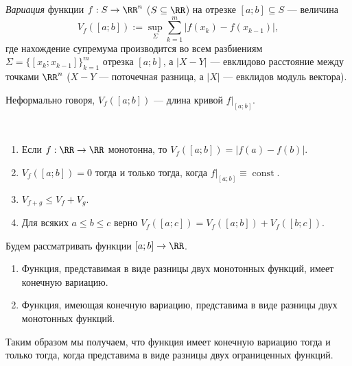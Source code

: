 \documentclass[12pt,a4paper]{article}
\DeclareMathOperator{\const}{const}
\begin{document}
    \begin{definition}
        \emph{Вариация} функции $f: S \to \RR^n$ ($S \subseteq \RR$) на отрезке $[a; b] \subseteq S$ --- величина
        \[V_f([a; b]) := \sup_\Sigma \sum_{k=1}^{m} |f(x_k) - f(x_{k-1})|,\]
        где нахождение супремума производится во всем разбиениям $\Sigma = \{[x_k; x_{k-1}]\}_{k=1}^m$ отрезка $[a; b]$, а $|X - Y|$ --- евклидово расстояние между точками $\RR^n$ ($X - Y$ --- поточечная разница, а $|X|$ --- евклидов модуль вектора).
    \end{definition}

    \begin{remark*}
        Неформально говоря, $V_f([a; b])$ --- длина кривой $f|_{[a; b]}$.
    \end{remark*}

    \begin{lemma}\ 
        \begin{enumerate}
            \item Если $f: \RR \to \RR$ монотонна, то $V_f([a; b]) = |f(a) - f(b)|$.
            \item $V_f([a; b]) = 0$ тогда и только тогда, когда $f|_{[a; b]} \equiv \const$.
            \item $V_{f+g} \leqslant V_f + V_g$.
            \item Для всяких $a \leqslant b \leqslant c$ верно $V_f([a; c]) = V_f([a; b]) + V_f([b; c])$.
        \end{enumerate}
    \end{lemma}

    \begin{lemma}
        Будем рассматривать функции $[a; b] \to \RR$.
        \begin{enumerate}
            \item Функция, представимая в виде разницы двух монотонных функций, имеет конечную вариацию.
            \item Функция, имеющая конечную вариацию, представима в виде разницы двух монотонных функций.
        \end{enumerate}
        Таким образом мы получаем, что функция имеет конечную вариацию тогда и только тогда, когда представима в виде разницы двух ограниценных функций.
    \end{lemma}
\end{document}
